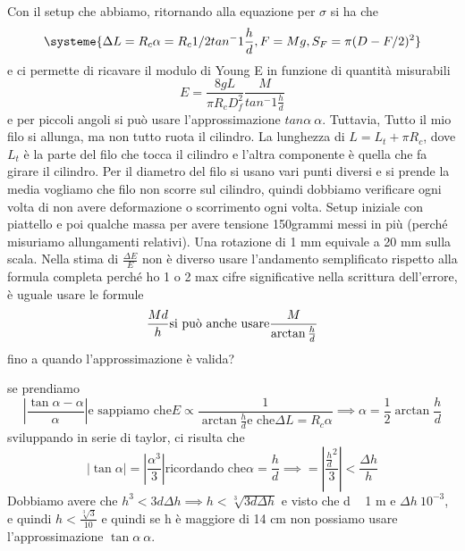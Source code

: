 \documentclass[a4paper]{article}
\begin{document}
Con il setup che abbiamo, ritornando alla equazione per $\sigma$ si ha che 
\begin{equation*}
    \systeme{
        \Delta L = R_c \alpha = R_c 1/2 tan^-1 \frac{h}{d},
        F = Mg,
        S_F = \pi (D-F/2)^2
    }
\end{equation*}
e ci permette di ricavare il modulo di Young E in funzione di quantità misurabili 
\begin{equation}
    E = \frac{8gL}{\pi R_c D^2_f} \frac{M}{tan^-1 \frac{h}{d}} 
\end{equation}
e per piccoli angoli si può usare l'approssimazione $tan \alpha ~ \alpha$. Tuttavia, Tutto il mio filo si allunga, ma non tutto ruota il cilindro. La lunghezza di $L = L_t + \pi R_c$, dove $L_t$ è la parte del filo che tocca il cilindro e l'altra componente è quella che fa girare il cilindro. Per il diametro del filo si usano vari punti diversi e si prende la media vogliamo che filo non scorre sul cilindro, quindi dobbiamo verificare ogni volta di non avere deformazione o scorrimento ogni volta. Setup iniziale con piattello e poi qualche massa per avere tensione 150grammi messi in più (perché misuriamo allungamenti relativi). Una rotazione di 1 mm equivale a 20 mm sulla scala.
Nella stima di $\frac{\Delta E}{E}$ non è diverso usare l'andamento semplificato rispetto alla formula completa perché ho 1 o 2 max cifre significative nella scrittura dell'errore, è uguale usare le formule 
\begin{equation}
    \frac{Md}{h}  \text{si può anche usare} \space \frac{M}{\arctan \frac{h}{d}}
\end{equation}
fino a quando l'approssimazione è valida?

se prendiamo 
\begin{equation}
    |\frac{\tan \alpha - \alpha}{\alpha}| \text{e sappiamo che} E \propto \frac{1}{\arctan \frac{h}{d} \text{e che} \Delta L = R_c \alpha} \implies \alpha = \frac{1}{2} \arctan \frac{h}{d}
\end{equation}
sviluppando in serie di taylor, ci risulta che 
\begin{equation}
    |\tan \alpha| = |\frac{\alpha^3}{3}| \text{ricordando che} \alpha = \frac{h}{d} \implies = |\frac{\frac{h}{d}^2}{3}| < \frac{\Delta h}{h}
\end{equation}
Dobbiamo avere che $h^3 < 3d\Delta h \implies h < \sqrt[3]{3d\Delta h}$ e visto che d ~ 1 m e $\Delta h ~ 10^{-3}$, e quindi $h<\frac{\sqrt[3]{3}}{10}$ e quindi se h è maggiore di 14 cm non possiamo usare l'approssimazione $\tan \alpha ~ \alpha$. 
\end{document}
